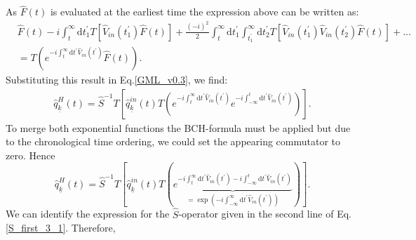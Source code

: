 \documentclass[
11pt, %
english, %
singlespacing, %
headsepline, %
]{MastersDoctoralThesis} %
\begin{document}
As $ \hat{F}(t) $ is evaluated at the earliest time the expression above can be written as: 
\begin{equation}\label{Move_in_T_from_right}
\begin{split}
&
\hat{F}(t)\!
-\!
i\!
\int_{t}^{\infty}\! \!\mathrm{d}t^{\prime}_{1}
 T
 \left[ 
 \hat{V}_{in}(t^{\prime}_{1})
 \hat{F}(t)
 \right] \!
+\!
\frac{(-i)^{2}}{2}\!\!
\int_{t}^{\infty}\!  \mathrm{d}t^{\prime}_{1}
\int_{t^{\prime}_{1}}^{\infty}\!\!\mathrm{d}t^{\prime}_{2}
 T
 \left[ 
 \hat{V}_{in}(t^{\prime}_{1})\hat{V}_{in}(t^{\prime}_{2})
\hat{F}(t) 
 \right] 
+\ldots
\\
&=
T\left( 
 e^{-i\int_{t}^{\infty}\mathrm{d}t^{\prime} \hat{V}_{in}(t^{\prime})}
\hat{F}(t)
\right)
.
\end{split}
\end{equation} 
Substituting this result in Eq.\enskip\eqref{GML_v0.3}, we find:
\begin{equation}
\begin{split}
\hat{q}^{H}_{\underline{k}}(t)
=
\hat{S}^{-1} 
T
\left[
\hat{q}^{in}_{\underline{k}}(t)
T
\left( 
 e^{-i\int_{t}^{\infty}\mathrm{d}t^{\prime} \hat{V}_{in}(t^{\prime})}
 e^{-i\int_{-\infty}^{t}\mathrm{d}t^{\prime} \hat{V}_{in}(t^{\prime})}
\right) 
\right] 
.
\end{split}
\end{equation}
To merge both exponential functions the BCH-formula must be applied but due to the chronological time ordering, we could set the appearing commutator to zero. Hence
\begin{equation}\label{3rd_expression_for_Omega_H}
\hat{q}^{H}_{\underline{k}}(t)
=
\hat{S}^{-1} 
T
\left[
\hat{q}^{in}_{\underline{k}}(t)
T
\left( 
\underbrace{
 e^{-i\int_{t}^{\infty}\mathrm{d}t^{\prime} \hat{V}_{in}(t^{\prime})-i\int_{-\infty}^{t}\mathrm{d}t^{\prime} \hat{V}_{in}(t^{\prime})}
 }_{
 =\exp(-i\int_{-\infty}^{\infty}\mathrm{d}t^{\prime} \hat{V}_{in}(t^{\prime}))
 }
\right) 
\right]
.
\end{equation}
We can identify the expression for the $ \hat{S} $-operator given in the second line of Eq.\enskip\eqref{S_first_3_1}. Therefore,
\end{document}
